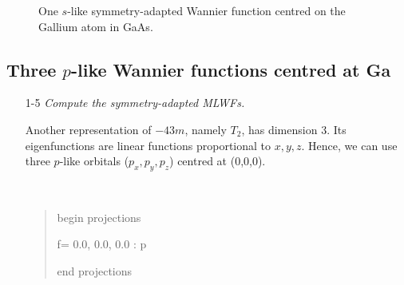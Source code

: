 	\begin{figure}[h!]
	\centering
	\centering
	\caption{One $s$-like symmetry-adapted Wannier function centred on the Gallium atom in GaAs.}\label{fig21.1}
	\end{figure}
\clearpage

\subsection*{Three $p$-like Wannier functions centred at Ga}
\begin{itemize}
	\item[1-5] {\it  Compute the symmetry-adapted MLWFs.}

    Another representation of ${-}43m$, namely $T_2$, has dimension 3. Its eigenfunctions are linear functions proportional to $x,y,z$. Hence, we can use three $p$-like orbitals ($p_x,p_y,p_z$) centred at (0,0,0).
	{\tt
	\begin{quote}
	begin projections
	
	f= 0.0, 0.0, 0.0 : p
	
	end projections
	\end{quote}
	}


\end{itemize}

